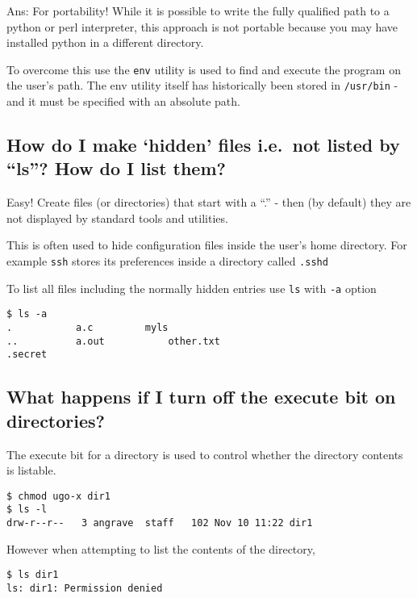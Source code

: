 Ans: For portability! While it is possible to write the fully qualified
path to a python or perl interpreter, this approach is not portable
because you may have installed python in a different directory.

To overcome this use the \texttt{env} utility is used to find and
execute the program on the user's path. The env utility itself has
historically been stored in \texttt{/usr/bin} - and it must be specified
with an absolute path.

\subsection{\texorpdfstring{How do I make `hidden' files i.e.~not listed
by ``ls''? How do I list
them?}{How do I make hidden files i.e.~not listed by ls? How do I list them?}}\label{how-do-i-make-hidden-files-i.e.not-listed-by-ls-how-do-i-list-them}

Easy! Create files (or directories) that start with a ``.'' - then (by
default) they are not displayed by standard tools and utilities.

This is often used to hide configuration files inside the user's home
directory. For example \texttt{ssh} stores its preferences inside a
directory called \texttt{.sshd}

To list all files including the normally hidden entries use \texttt{ls}
with \texttt{-a} option

\begin{verbatim}
$ ls -a
.           a.c         myls
..          a.out           other.txt
.secret 
\end{verbatim}

\subsection{What happens if I turn off the execute bit on
directories?}\label{what-happens-if-i-turn-off-the-execute-bit-on-directories}

The execute bit for a directory is used to control whether the directory
contents is listable.

\begin{verbatim}
$ chmod ugo-x dir1
$ ls -l
drw-r--r--   3 angrave  staff   102 Nov 10 11:22 dir1
\end{verbatim}

However when attempting to list the contents of the directory,

\begin{verbatim}
$ ls dir1
ls: dir1: Permission denied
\end{verbatim}

